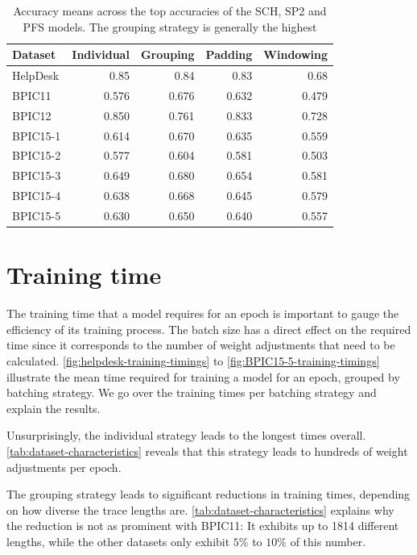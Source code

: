 \begin{table}
\centering
\begin{tabular}{l|rrrr}
Dataset  &  Individual &  Grouping &   Padding &  Windowing\\
\midrule
HelpDesk &    0.85     &  0.84     &  0.83     &  0.68     \\
BPIC11   &    0.576    &  0.676    &  0.632    &  0.479    \\
BPIC12   &    0.850    &  0.761    &  0.833    &  0.728    \\
BPIC15-1 &    0.614    &  0.670    &  0.635    &  0.559    \\
BPIC15-2 &    0.577    &  0.604    &  0.581    &  0.503    \\
BPIC15-3 &    0.649    &  0.680    &  0.654    &  0.581    \\
BPIC15-4 &    0.638    &  0.668    &  0.645    &  0.579    \\
BPIC15-5 &    0.630    &  0.650    &  0.640    &  0.557    \\
\end{tabular}
\caption[Grouping strategy leads to best mean accuracies]{Accuracy means across the top accuracies of the SCH, SP2 and PFS models. The grouping strategy is generally the highest}
\label{tab:strategy-top-accuracies}
\end{table}
\FloatBarrier

\section{Training time}\label{sec:eval:training-time}
The training time that a model requires for an epoch is important to gauge the efficiency of its training process. The batch size has a direct effect on the required time since it corresponds to the number of weight adjustments that need to be calculated. \autoref{fig:helpdesk-training-timings} to \autoref{fig:BPIC15-5-training-timings} illustrate the mean time required for training a model for an epoch, grouped by batching strategy. We go over the training times per batching strategy and explain the results.

Unsurprisingly, the individual strategy leads to the longest times overall. \autoref{tab:dataset-characteristics} reveals that this strategy leads to hundreds of weight adjustments per epoch.

The grouping strategy leads to significant reductions in training times, depending on how diverse the trace lengths are. \autoref{tab:dataset-characteristics} explains why the reduction is not as prominent with BPIC11: It exhibits up to 1814 different lengths, while the other datasets only exhibit $5\%$ to $10\%$ of this number.

